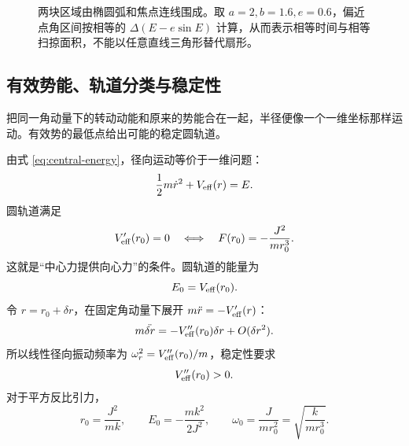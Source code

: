 \begin{figure}[htbp]
\centering
{}
\caption{两块区域由椭圆弧和焦点连线围成。取 $a=2,b=1.6,e=0.6$，偏近点角区间按相等的 $\Delta(E-e\sin E)$ 计算，从而表示相等时间与相等扫掠面积，不能以任意直线三角形替代扇形。}
\label{fig:kepler-area}
\end{figure}

\subsection{有效势能、轨道分类与稳定性}

把同一角动量下的转动动能和原来的势能合在一起，半径便像一个一维坐标那样运动。有效势的最低点给出可能的稳定圆轨道。

由式 \eqref{eq:central-energy}，径向运动等价于一维问题：
\begin{equation}
\frac12m\dot r^2+V_{\rm eff}(r)=E.
\end{equation}
圆轨道满足
\begin{equation}
V_{\rm eff}'(r_0)=0
\quad\Longleftrightarrow\quad
F(r_0)=-\frac{J^2}{mr_0^3}.
\label{eq:circular-condition}
\end{equation}
这就是“中心力提供向心力”的条件。圆轨道的能量为
\begin{equation}
E_0=V_{\rm eff}(r_0).
\end{equation}
令 $r=r_0+\delta r$，在固定角动量下展开 $m\ddot r=-V_{\rm eff}'(r)$：
\[
m\ddot{\delta r}=-V_{\rm eff}''(r_0)\delta r+O(\delta r^2).
\]
所以线性径向振动频率为 $\omega_r^2=V_{\rm eff}''(r_0)/m$，稳定性要求
\begin{equation}
V_{\rm eff}''(r_0)>0.
\label{eq:stability}
\end{equation}
对于平方反比引力，
\begin{equation}
r_0=\frac{J^2}{mk},\qquad
E_0=-\frac{mk^2}{2J^2},\qquad
\omega_0=\frac{J}{mr_0^2}=\sqrt{\frac{k}{mr_0^3}}.
\end{equation}

